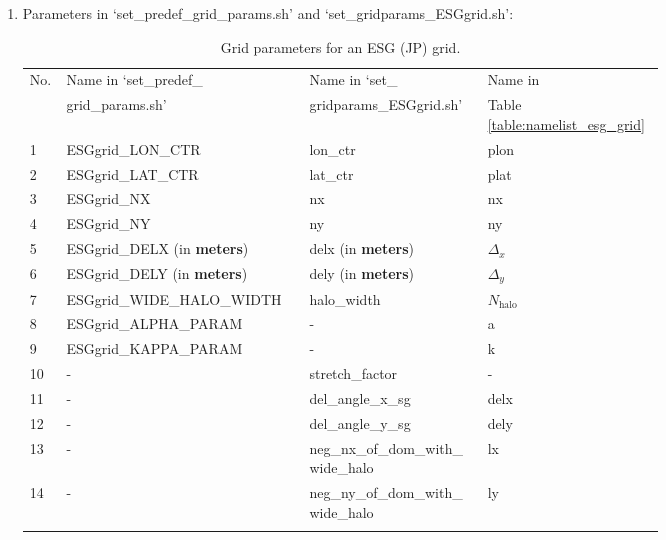 \documentclass[11pt,fleqn]{report}              %
\begin{document}
\begin{enumerate}
{\bf Notes)}
\begin{itemize}
\item Since the super-grid has twice the resolution of the actual grid, the grid spacing in the $x$ direction on the actual grid will be twice this resolution.
\item The physical grid spacing $\Delta_x$ on the actual grid is related to `delx' by $\Delta_x=2 \times \text{delx} \times (P_E/360)$ where $P_E$ is the Earth's circumference, and the factor 2 appears due to `delx' being the grid angle in the $x$ direction of the super-grid. Therefore, $\text{delx}=\Delta_x / (2 \times R_E ) \times (360/2\pi)$ where $R_E$ is the radius of the Earth ($\approx 6371 km$). For example, `delx=0.0135' for the 3$km$ actual grid spacing.
\item These parameters can be found by {\it fv3grid} as shown in Section \ref{subsec:fv3grid_esg_jp}.
\item The source code can be found in `$\sim$/UFS\_UTILS/sorc/grid\_tolls.fd/regional\_esg\_grid.fd'.
\end{itemize}


\item Parameters in `set\_predef\_grid\_params.sh' and `set\_gridparams\_ESGgrid.sh':

{
\fontsize{10}{12}\selectfont
\begin{longtable}{p{0.03\linewidth} | p{0.33\linewidth} | p{0.25\linewidth} | p{0.15\linewidth} }
\hline
\hline
\multirow{2}{*}{No.} & Name in `set\_predef\_  & Name in `set\_  & Name in   \\
 & grid\_params.sh' & gridparams\_ESGgrid.sh'   & Table \ref{table:namelist_esg_grid} \\
\hline
1 & ESGgrid\_LON\_CTR & lon\_ctr & plon  \\
2 & ESGgrid\_LAT\_CTR & lat\_ctr & plat  \\
3 & ESGgrid\_NX & nx & nx  \\
4 & ESGgrid\_NY & ny & ny \\
5 & ESGgrid\_DELX (in {\bf meters}) & delx (in {\bf meters}) & $\Delta_x$ \\
6 & ESGgrid\_DELY (in {\bf meters}) & dely (in {\bf meters}) & $\Delta_y$ \\
7 & ESGgrid\_WIDE\_HALO\_WIDTH & halo\_width & $N_{\text{halo}}$  \\
8 & ESGgrid\_ALPHA\_PARAM & - & a \\
9 & ESGgrid\_KAPPA\_PARAM & - & k \\
10 & - & stretch\_factor & - \\
11 & - & del\_angle\_x\_sg & delx  \\
12 & - & del\_angle\_y\_sg & dely  \\
13 & - & neg\_nx\_of\_dom\_with\_ wide\_halo & lx  \\
14 & - & neg\_ny\_of\_dom\_with\_ wide\_halo & ly  \\
\hline
\caption{Grid parameters for an ESG (JP) grid.}
\label{table:gridparams_jp}
\end{longtable}
}


\end{enumerate}
\end{document}
